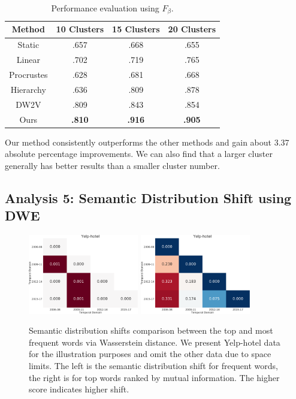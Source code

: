 \begin{table}[htp]
\centering
\begin{tabular}{c||ccc}
Method & 10 Clusters & 15 Clusters & 20 Clusters \\\hline\hline
Static & .657 & .668 & .655 \\
Linear & .702 & .719 & .765 \\
Procrustes & .628 & .681 & .668 \\
Hierarchy & .636 & .809 & .878 \\
DW2V & .809 & .843 & .854 \\
Ours & \textbf{.810} & \textbf{.916} & \textbf{.905}
\end{tabular}
\caption{Performance evaluation using $F_\beta$.}
\label{chap3:tab:dweEval}
\end{table}

Our method consistently outperforms the other methods and gain about 3.37 absolute percentage improvements. We can also find that a larger cluster generally has better results than a smaller cluster number.


\subsection{Analysis 5: Semantic Distribution Shift using DWE}

\begin{figure}[tb!]
\centering
\includegraphics[width=0.43\textwidth]{images/chapter3/sm_shift/yelp_hotel_year_freq.pdf}
\includegraphics[width=0.43\textwidth]{images/chapter3/sm_shift/yelp_hotel_year_mi.pdf}
\caption{Semantic distribution shifts comparison between the top and most frequent words via Wasserstein distance. We present Yelp-hotel data for the illustration purposes and omit the other data due to space limits. The left is the semantic distribution shift for frequent words, the right is for top words ranked by mutual information. The higher score indicates higher shift.}
\label{chap3:fig:sm_shift}
\end{figure}


